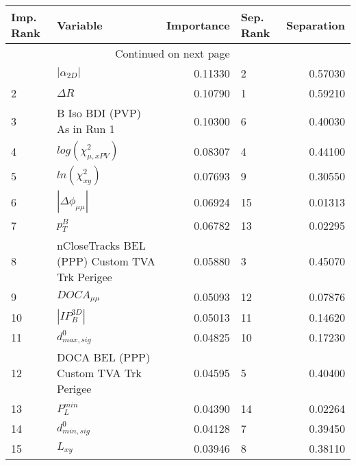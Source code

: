 \usepackage{lscape}

\begin{landscape}
\begin{longtable}{llrlr}
\toprule
Imp. Rank &                                       Variable &  Importance & Sep. Rank &  Separation \\
\midrule
\endhead
\midrule
\multicolumn{3}{r}{{Continued on next page}} \\
\midrule
\endfoot

\bottomrule
\endlastfoot
        1 &                                $|\alpha_{2D}|$ &     0.11330 &         2 &     0.57030 \\
        2 &                                     $\Delta R$ &     0.10790 &         1 &     0.59210 \\
        3 &                    B Iso BDI (PVP) As in Run 1 &     0.10300 &         6 &     0.40030 \\
        4 &                      $log(\chi^{2}_{\mu,xPV})$ &     0.08307 &         4 &     0.44100 \\
        5 &                            $ln(\chi^{2}_{xy})$ &     0.07693 &         9 &     0.30550 \\
        6 &                       $|\Delta \phi_{\mu\mu}|$ &     0.06924 &        15 &     0.01313 \\
        7 &                                      $p^B_{T}$ &     0.06782 &        13 &     0.02295 \\
        8 &  nCloseTracks BEL (PPP) Custom TVA Trk Perigee &     0.05880 &         3 &     0.45070 \\
        9 &                                $DOCA_{\mu\mu}$ &     0.05093 &        12 &     0.07876 \\
       10 &                                $|IP_{B}^{3D}|$ &     0.05013 &        11 &     0.14620 \\
       11 &                               $d^0_{max, sig}$ &     0.04825 &        10 &     0.17230 \\
       12 &          DOCA BEL (PPP) Custom TVA Trk Perigee &     0.04595 &         5 &     0.40400 \\
       13 &                                  $P^{min}_{L}$ &     0.04390 &        14 &     0.02264 \\
       14 &                               $d^0_{min, sig}$ &     0.04128 &         7 &     0.39450 \\
       15 &                                       $L_{xy}$ &     0.03946 &         8 &     0.38110 \\
\end{longtable}

\end{landscape}
